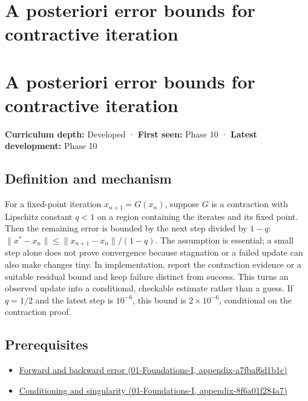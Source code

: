 \hypertarget{appendix-d83b0ad1be7f}{}
\section*{A posteriori error bounds for contractive iteration}
\section{A posteriori error bounds for contractive iteration}\label{appendix-d83b0ad1be7f-a-posteriori-error-bounds-for-contractive-iteration}

\textbf{Curriculum depth:} Developed · \textbf{First seen:} Phase 10 · \textbf{Latest development:} Phase 10

\subsection{Definition and mechanism}\label{appendix-d83b0ad1be7f-definition-and-mechanism}

For a fixed-point iteration \(x_{n+1}=G(x_n)\), suppose \(G\) is a contraction with Lipschitz constant \(q<1\) on a region containing the iterates and its fixed point. Then the remaining error is bounded by the next step divided by \(1-q\): \(\|x^*-x_n\|\le\|x_{n+1}-x_n\|/(1-q)\). The assumption is essential; a small step alone does not prove convergence because stagnation or a failed update can also make changes tiny. In implementation, report the contraction evidence or a suitable residual bound and keep failure distinct from success. This turns an observed update into a conditional, checkable estimate rather than a guess. If \(q=1/2\) and the latest step is \(10^{-6}\), this bound is \(2\times10^{-6}\), conditional on the contraction proof.

\subsection{Prerequisites}\label{appendix-d83b0ad1be7f-prerequisites}

\begin{itemize}
\tightlist
\item
  \href{../01-Foundations-I/main.pdf\#nameddest=appendix-a7fbaf6d1b1c}{Forward and backward error (01-Foundations-I, appendix-a7fbaf6d1b1c)}
\item
  \href{../01-Foundations-I/main.pdf\#nameddest=appendix-8f6a01f284a7}{Conditioning and singularity (01-Foundations-I, appendix-8f6a01f284a7)}
\end{itemize}

